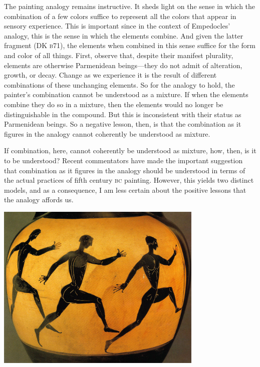 The painting analogy remains instructive. It sheds light on the sense in which the combination of a few colors suffice to represent all the colors that appear in sensory experience. This is important since in the context of Empedocles' analogy, this is the sense in which the elements combine. And given the latter fragment (DK \textsc{b}71), the elements when combined in this sense suffice for the form and color of all things. First, observe that, despite their manifest plurality, elements are otherwise Parmenidean beings---they do not admit of alteration, growth, or decay. Change as we experience it is the result of different combinations of these unchanging elements. So for the analogy to hold, the painter's combination cannot be understood as a mixture. If when the elements combine they do so in a mixture, then the elements would no longer be distinguishable in the compound. But this is inconsistent with their status as Parmenidean beings. So a negative lesson, then, is that the combination as it figures in the analogy cannot coherently be understood as mixture.

If combination, here, cannot coherently be understood as mixture, how, then, is it to be understood? Recent commentators have made the important suggestion that combination as it figures in the analogy should be understood in terms of the actual practices of fifth century \textsc{bc} painting. However, this yields two distinct models, and as a consequence, I am less certain about the positive lessons that the analogy affords us. \change

\begin{frame}
	\begin{center}
		\includegraphics[height=8cm]{../../graphics/archaic.jpg}
	\end{center}
\end{frame}

